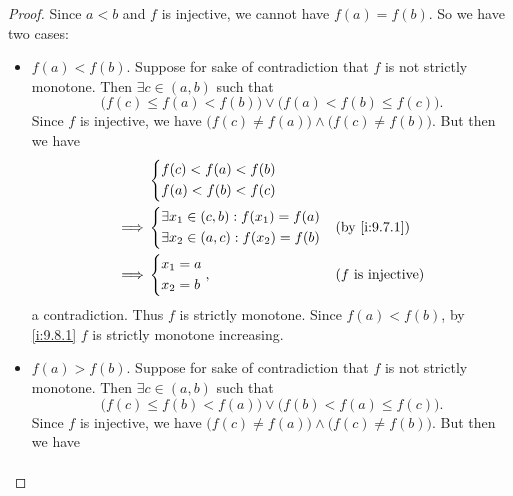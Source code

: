 \begin{proof}
  Since \(a < b\) and \(f\) is injective, we cannot have \(f(a) = f(b)\).
  So we have two cases:
  \begin{itemize}
    \item \(f(a) < f(b)\).
          Suppose for sake of contradiction that \(f\) is not strictly monotone.
          Then \(\exists c \in (a, b)\) such that
          \[
            \big(f(c) \leq f(a) < f(b)\big) \lor \big(f(a) < f(b) \leq f(c)\big).
          \]
          Since \(f\) is injective, we have \(\big(f(c) \neq f(a)\big) \land \big(f(c) \neq f(b)\big)\).
          But then we have
          \begin{align*}
                     & \begin{dcases}
                         f(c) < f(a) < f(b) \\
                         f(a) < f(b) < f(c)
                       \end{dcases}                                                        \\
            \implies & \begin{dcases}
                         \exists x_1 \in (c, b) : f(x_1) = f(a) \\
                         \exists x_2 \in (a, c) : f(x_2) = f(b) \\
                       \end{dcases} &  & \by{i:9.7.1}                                    \\
            \implies & \begin{dcases}
                         x_1 = a \\
                         x_2 = b
                       \end{dcases},                            &  & \text{(\(f\) is injective)}
          \end{align*}
          a contradiction.
          Thus \(f\) is strictly monotone.
          Since \(f(a) < f(b)\), by \cref{i:9.8.1} \(f\) is strictly monotone increasing.
    \item \(f(a) > f(b)\).
          Suppose for sake of contradiction that \(f\) is not strictly monotone.
          Then \(\exists c \in (a, b)\) such that
          \[
            \big(f(c) \leq f(b) < f(a)\big) \lor \big(f(b) < f(a) \leq f(c)\big).
          \]
          Since \(f\) is injective, we have \(\big(f(c) \neq f(a)\big) \land \big(f(c) \neq f(b)\big)\).
          But then we have
          \begin{align*}

\end{align*}
\end{itemize}
\end{proof}
